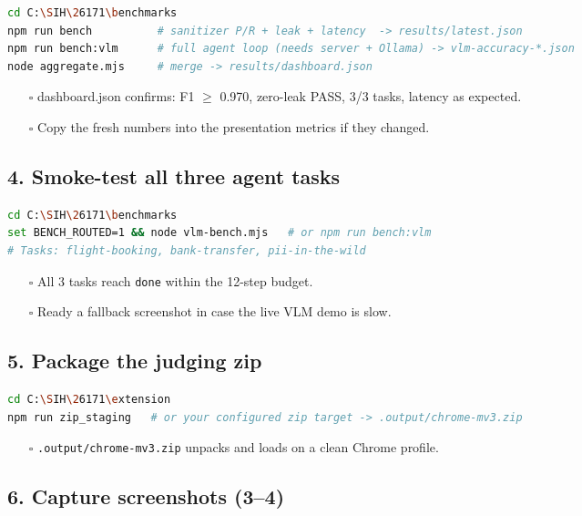 \documentclass[11pt,a4paper]{article}
\newcommand{\code}[1]{\texttt{#1}}
\newcommand{\todo}{\textcolor{amber}{$\square$}}
\begin{document}
\begin{itemize}
\begin{lstlisting}[language=bash]
cd C:\SIH\26171\benchmarks
npm run bench          # sanitizer P/R + leak + latency  -> results/latest.json
npm run bench:vlm      # full agent loop (needs server + Ollama) -> vlm-accuracy-*.json
node aggregate.mjs     # merge -> results/dashboard.json
\end{lstlisting}

\begin{itemize}
\item[\todo] dashboard.json confirms: F1 $\geq$ 0.970, zero-leak PASS, 3/3 tasks, latency as expected.
\item[\todo] Copy the fresh numbers into the presentation metrics if they changed.
\end{itemize}

\subsection{4. Smoke-test all three agent tasks}

\begin{lstlisting}[language=bash]
cd C:\SIH\26171\benchmarks
set BENCH_ROUTED=1 && node vlm-bench.mjs   # or npm run bench:vlm
# Tasks: flight-booking, bank-transfer, pii-in-the-wild
\end{lstlisting}

\begin{itemize}
\item[\todo] All 3 tasks reach \code{done} within the 12-step budget.
\item[\todo] Ready a fallback screenshot in case the live VLM demo is slow.
\end{itemize}

\subsection{5. Package the judging zip}

\begin{lstlisting}[language=bash]
cd C:\SIH\26171\extension
npm run zip_staging   # or your configured zip target -> .output/chrome-mv3.zip
\end{lstlisting}

\begin{itemize}
\item[\todo] \code{.output/chrome-mv3.zip} unpacks and loads on a clean Chrome profile.
\end{itemize}

\subsection{6. Capture screenshots (3--4)}


\end{itemize}
\end{document}
